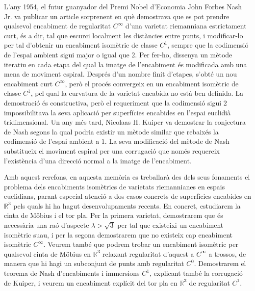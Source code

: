 L'any 1954, el futur guanyador del Premi Nobel d'Economia John Forbes Nash Jr. va publicar un article sorprenent en què demostrava que es pot prendre qualsevol encabiment de regularitat $C^\infty$ d'una varietat riemanniana estrictament curt, és a dir, tal que escurci localment les distàncies entre punts, i modificar-lo per tal d'obtenir un encabiment isomètric de classe $C^1$, sempre que la codimensió de l'espai ambient sigui major o igual que 2. Per fer-ho, dissenya un mètode iteratiu en cada etapa del qual la imatge de l'encabiment és modificada amb una mena de moviment espiral. Després d'un nombre finit d'etapes, s'obté un nou encabiment curt $C^\infty$, però el procés convergeix en un encabiment isomètric de classe $C^1$, pel qual la curvatura de la varietat encabida no està ben definida. La demostració és constructiva, però el requeriment que la codimensió sigui $2$ impossibilitava la seva aplicació per superfícies encabides en l'espai euclidià tridimensional. Un any més tard, Nicolaas H. Kuiper va demostrar la conjectura de Nash segons la qual podria existir un mètode similar que rebaixés la codimensió de l'espai ambient a $1$. La seva modificació del mètode de Nash substitueix el moviment espiral per una corrugació que només requereix l'existència d'una direcció normal a la imatge de l'encabiment.

Amb aquest rerefons, en aquesta memòria es treballarà des dels seus fonaments el problema dels encabiments isomètrics de varietats riemannianes en espais euclidians, parant especial atenció a dos casos concrets de superfícies encabides en $\mathbb R^3$ pels quals hi ha hagut desenvolupaments recents. En concret, estudiarem la cinta de Möbius i el tor pla. Per la primera varietat, demostrarem que és necessària una raó d'aspecte $\lambda>\sqrt3$ per tal que existeixi un encabiment isomètric suau, i per la segona demostrarem que no existeix cap encabiment isomètric $C^\infty$. Veurem també que podrem trobar un encabiment isomètric per qualsevol cinta de Möbius en $\mathbb R^3$ relaxant regularitat d'aquest a $C^\infty$ a trossos, de manera que hi hagi un subconjunt de punts amb regularitat $C^0$. Demostrarem el teorema de Nash d'encabiments i immersions $C^1$, explicant també la corrugació de Kuiper, i veurem un encabiment explícit del tor pla en $\mathbb R^3$ de regularitat $C^1$.

